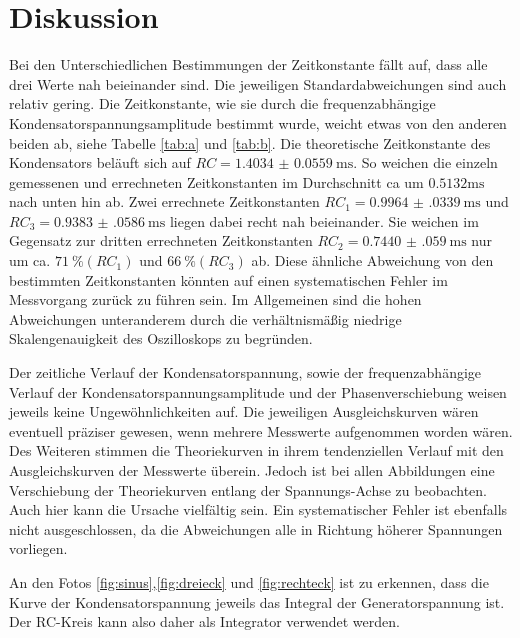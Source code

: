\section{Diskussion}
\label{sec:Diskussion}

Bei den Unterschiedlichen Bestimmungen der Zeitkonstante fällt auf, dass alle drei Werte nah beieinander sind. Die jeweiligen 
Standardabweichungen sind auch relativ gering. Die Zeitkonstante, wie sie durch die frequenzabhängige Kondensatorspannungsamplitude 
bestimmt wurde, weicht etwas von den anderen beiden ab, siehe Tabelle \ref{tab:a} und \ref{tab:b}.
Die theoretische Zeitkonstante des Kondensators beläuft sich auf $RC = \SI{1.4034(559)}{\milli\s}$. So weichen die einzeln gemessenen und errechneten
Zeitkonstanten im Durchschnitt ca um $0.5132 \si{\milli\s}$ nach unten hin ab. Zwei errechnete Zeitkonstanten $RC_1= \SI{0.9964(0339)}{\milli\s}$ und $RC_3=\SI{0.9383(0586)}{\milli\s}$
liegen dabei recht nah beieinander. Sie weichen im Gegensatz zur dritten errechneten Zeitkonstanten $RC_2=\SI{0.7440(0590)}{\milli\s}$ nur um ca. $\SI{71}{\percent}(RC_1)$ und $\SI{66}{\percent}(RC_3)$ ab.
Diese ähnliche Abweichung von den bestimmten Zeitkonstanten könnten auf einen systematischen Fehler im Messvorgang zurück zu führen sein. Im Allgemeinen sind die hohen Abweichungen
unteranderem durch die verhältnismäßig niedrige Skalengenauigkeit des Oszilloskops zu begründen. 

Der zeitliche Verlauf der Kondensatorspannung, sowie der frequenzabhängige Verlauf der Kondensatorspannungsamplitude und der
Phasenverschiebung weisen jeweils keine Ungewöhnlichkeiten auf. Die jeweiligen Ausgleichskurven wären eventuell präziser
gewesen, wenn mehrere Messwerte aufgenommen worden wären. Des Weiteren stimmen die Theoriekurven in ihrem tendenziellen Verlauf mit den Ausgleichskurven der Messwerte überein. Jedoch ist bei allen Abbildungen eine Verschiebung der Theoriekurven entlang der Spannungs-Achse zu beobachten. Auch hier kann die Ursache vielfältig sein. Ein systematischer Fehler ist ebenfalls nicht ausgeschlossen, da die Abweichungen alle in Richtung höherer Spannungen vorliegen.

An den Fotos \ref{fig:sinus},\ref{fig:dreieck} und \ref{fig:rechteck} ist zu erkennen, dass die Kurve der Kondensatorspannung jeweils
das Integral der Generatorspannung ist. Der RC-Kreis kann also daher als Integrator verwendet werden. 




